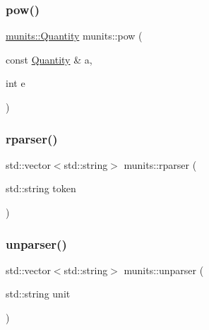 \subsubsection{\texorpdfstring{pow()}{pow()}}
{\footnotesize\ttfamily \hyperlink{classmunits_1_1_quantity}{munits\+::\+Quantity} munits\+::pow (\begin{DoxyParamCaption}\item[{const \hyperlink{classmunits_1_1_quantity}{Quantity} \&}]{a,  }\item[{int}]{e }\end{DoxyParamCaption})}

\mbox{\label{namespacemunits_a10ce8183cbfa4ab0a239a45c56f4dcbe}} 
\subsubsection{\texorpdfstring{rparser()}{rparser()}}
{\footnotesize\ttfamily std\+::vector$<$std\+::string$>$ munits\+::rparser (\begin{DoxyParamCaption}\item[{std\+::string}]{token }\end{DoxyParamCaption})}

\mbox{\label{namespacemunits_a0035cd1272a835c8d06716a9e866b720}} 
\subsubsection{\texorpdfstring{unparser()}{unparser()}}
{\footnotesize\ttfamily std\+::vector$<$std\+::string$>$ munits\+::unparser (\begin{DoxyParamCaption}\item[{std\+::string}]{unit }\end{DoxyParamCaption})}

